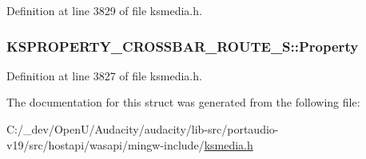 Definition at line 3829 of file ksmedia.\+h.

\subsubsection[{\texorpdfstring{Property}{Property}}]{ K\+S\+P\+R\+O\+P\+E\+R\+T\+Y\+\_\+\+C\+R\+O\+S\+S\+B\+A\+R\+\_\+\+R\+O\+U\+T\+E\+\_\+\+S\+::\+Property}\hypertarget{struct_k_s_p_r_o_p_e_r_t_y___c_r_o_s_s_b_a_r___r_o_u_t_e___s_a2e6534800abec1c664fc4c9a24f7453f}{}\label{struct_k_s_p_r_o_p_e_r_t_y___c_r_o_s_s_b_a_r___r_o_u_t_e___s_a2e6534800abec1c664fc4c9a24f7453f}


Definition at line 3827 of file ksmedia.\+h.



The documentation for this struct was generated from the following file\+:\begin{DoxyCompactItemize}
\item 
C\+:/\+\_\+dev/\+Open\+U/\+Audacity/audacity/lib-\/src/portaudio-\/v19/src/hostapi/wasapi/mingw-\/include/\hyperlink{ksmedia_8h}{ksmedia.\+h}\end{DoxyCompactItemize}
